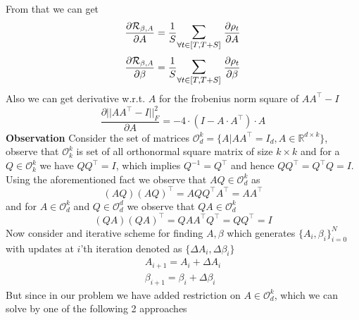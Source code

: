 \newline From that we can get
\begin{equation}
    \frac{\partial \mathcal{R}_{\beta, A}}{\partial A} = \frac{1}{S} \mathlarger{\mathlarger{\sum}}_{\forall t\in [T,T+S]} \hspace{1mm} \frac{\partial \rho_t}{\partial A} 
\end{equation}
\begin{equation}
    \frac{\partial \mathcal{R}_{\beta, A}}{\partial \beta} = \frac{1}{S} \mathlarger{\mathlarger{\sum}}_{\forall t\in [T,T+S]} \hspace{1mm} \frac{\partial \rho_t}{\partial \beta} 
\end{equation}
\newline Also we can get derivative w.r.t. $A$ for the frobenius norm square of $AA^\top-I$
\begin{equation} \label{eq:derivative_forb_norm_ofAAtmI}
    \frac{\partial ||AA^\top-I||^2_F}{\partial A} = -4\cdot (I-A\cdot A^\top )\cdot A
\end{equation}
\textbf{Observation}\newline 
Consider the set of matrices $\mathcal{O}_d^k = \{ A | AA^\top = I_d, A \in \mathbb{R}^{d\times k} \}$, observe that $\mathcal{O}_k^k$ is set of all orthonormal square matrix of size $k\times k$ and for a $Q\in \mathcal{O}_k^k$ we have $QQ^\top = I$, which implies $Q^{-1}= Q^\top$ and hence $QQ^\top = Q^\top Q = I$. Using the aforementioned fact we observe that $AQ\in \mathcal{O}_d^k$ as
\begin{equation} \label{observation:ortho-closure_odk}
    (AQ)(AQ)^\top = AQQ^\top A^\top = AA^\top 
\end{equation}
and for $A \in\mathcal{O}_d^k$ and $Q \in\mathcal{O}_d^d$ we observe that $QA\in \mathcal{O}_d^k$
\begin{equation} \label{observation:ortho-closure_odk_2}
    (QA)(QA)^\top = QAA^\top Q^\top = QQ^\top  = I
\end{equation}
Now consider and iterative scheme for finding $A, \beta$ which generates $\{A_i, \beta_i\}_{i=0}^{N}$ with updates at $i$'th iteration denoted as $\{\Delta A_i, \Delta \beta_i\}$
\begin{equation}
\begin{aligned}
    A_{i+1} = A_i + \Delta A_i \\
    \beta_{i+1} = \beta_i + \Delta \beta_i
\end{aligned}
\end{equation}
But since in our problem we have added restriction on $A \in \mathcal{O}_d^k$, which we can solve by one of the following 2 approaches 
